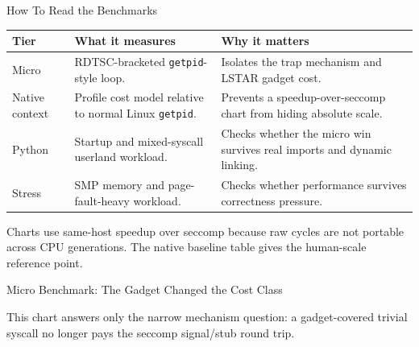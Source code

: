 \documentclass[aspectratio=169,11pt]{beamer}
\begin{document}
\begin{frame}{How To Read the Benchmarks}
\small
\begin{tabularx}{\textwidth}{@{}p{}p{}X@{}}
\toprule
Tier & What it measures & Why it matters \\
\midrule
Micro & RDTSC-bracketed \texttt{getpid}-style loop. & Isolates the trap mechanism and LSTAR gadget cost. \\
Native context & Profile cost model relative to normal Linux \texttt{getpid}. & Prevents a speedup-over-seccomp chart from hiding absolute scale. \\
Python & Startup and mixed-syscall userland workload. & Checks whether the micro win survives real imports and dynamic linking. \\
Stress & SMP memory and page-fault-heavy workload. & Checks whether performance survives correctness pressure. \\
\bottomrule
\end{tabularx}
\vspace{0.7em}
\scriptsize
Charts use same-host speedup over seccomp because raw cycles are not
portable across CPU generations. The native baseline table gives the
human-scale reference point.
\end{frame}

\begin{frame}{Micro Benchmark: The Gadget Changed the Cost Class}
\centering
{}
\vspace{0.3em}

\scriptsize
This chart answers only the narrow mechanism question: a gadget-covered
trivial syscall no longer pays the seccomp signal/stub round trip.
\end{frame}
\end{document}
